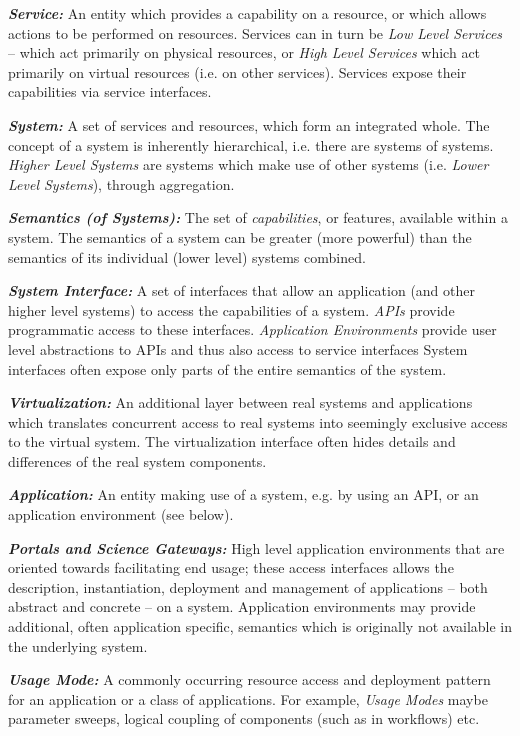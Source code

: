 \documentclass[conference,final]{IEEEtran}
\newcommand{\I}[1]{\textit{#1}}
\newcommand{\BI}[1]{\textbf{\textit{#1}}}
\begin{document}
 \BI{Service:} An entity which provides a capability on a resource, or
 which allows actions to be performed on resources.  Services can in
 turn be \I{Low Level Services} -- which act primarily on physical
 resources, or \I{High Level Services} which act primarily on virtual
 resources (i.e. on other services).  Services expose their
 capabilities via service interfaces.

 \BI{System:} A set of services and resources, which form an
 integrated whole.  The concept of a system is inherently
 hierarchical, i.e. there are systems of systems.  \I{Higher Level
 Systems} are systems which make use of other systems (i.e.  \I{Lower
 Level Systems}), through aggregation.

 \BI{Semantics (of Systems):} The set of {\it capabilities}, or
 features, available within a system.  The semantics of a system can
 be greater (more powerful) than the semantics of its individual
 (lower level) systems combined.  
 
 \BI{System Interface:} A set of interfaces that allow an application
 (and other higher level systems) to access the capabilities of a
 system.  \I{APIs} provide programmatic access to these interfaces.
 \I{Application Environments} provide user level abstractions to APIs
 and thus also access to service interfaces System interfaces often
 expose only parts of the entire semantics of the system.

 \BI{Virtualization:} An additional layer between real systems and
 applications which translates concurrent access to real systems into
 seemingly exclusive access to the virtual system.  The virtualization
 interface often hides details and differences of the real system
 components.  

 \BI{Application:} An entity making use of a system, e.g. by using an
 API, or an application environment (see below).

 \BI{Portals and Science Gateways:} High level application
 environments that are oriented towards facilitating end usage; these
 access interfaces allows the description, instantiation, deployment
 and management of applications -- both abstract and concrete -- on a
 system.  Application environments may provide additional, often
 application specific, semantics which is originally not available in
 the underlying system.

 \BI{Usage Mode:} A commonly occurring resource access and deployment
 pattern for an application or a class of applications. For example,
 {\it Usage Modes} maybe parameter sweeps, logical coupling of
 components (such as in workflows) etc.
\end{document}
